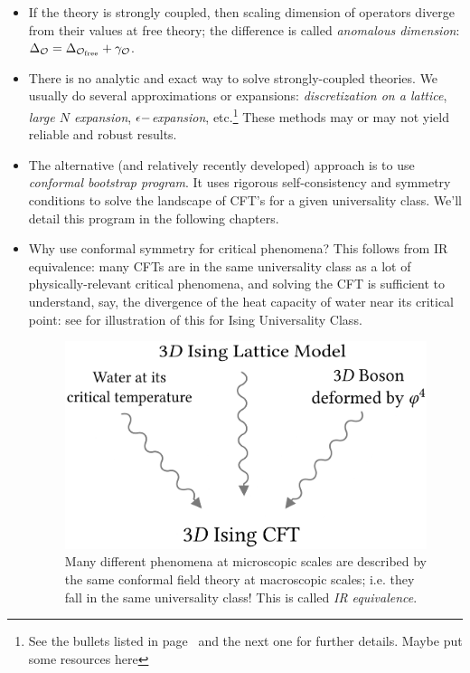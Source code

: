 \documentclass[12pt]{article}
\newcommand\draftnote[1]{{\color{blue} #1}}
\numberwithin{equation}{section}
\begin{document}
\begin{itemize}
\item If the theory is strongly coupled, then scaling dimension of operators diverge from their values at free theory; the difference is called \emph{anomalous dimension}: $\Delta_{\mathcal{O}}=\Delta_{\mathcal{O}_{\text{free}}}+\gamma_{\mathcal{O}}$.

\item There is no analytic and exact way to solve strongly-coupled theories. We usually do several approximations or expansions: \emph{discretization on a lattice}, \emph{large $N$ expansion}, \emph{$\epsilon-$expansion}, etc.\footnote{See the bullets listed in page~\pageref{items: problems with strongly coupled systems} and the next one for further details. \draftnote{Maybe put some resources here}}  These methods may or may not yield reliable and robust results.

\item The alternative (and relatively recently developed) approach is to use \emph{conformal bootstrap program}. It uses rigorous self-consistency and symmetry conditions to solve the landscape of CFT's for a given universality class. We'll detail this program in the following chapters.

\item Why use conformal symmetry for critical phenomena? This follows from IR equivalence: many CFTs are in the same universality class as a lot of physically-relevant critical phenomena, and solving the CFT is sufficient to understand, say, the divergence of the heat capacity of water near its critical point: see \figref{\ref{fig: ir equivalence}} for illustration of this for Ising Universality Class.

\begin{figure}
	\centering 
		\includegraphics[scale=.16]{universality}
	\caption[IR equivalence]{\label{fig: ir equivalence}Many different phenomena at microscopic scales are described by the same conformal field theory at macroscopic scales; i.e. they fall in the same universality class! This is called \emph{IR equivalence}.}
\end{figure}


\end{itemize}
\end{document}
